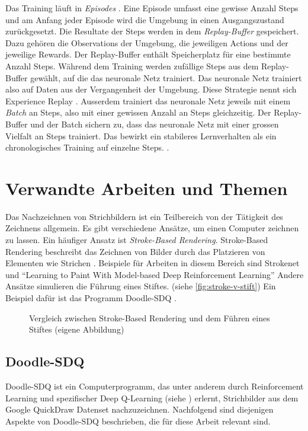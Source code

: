 Das Training läuft in \emph{Episodes} \cite[S. 14]{sutton_reinforcement_2014}.
Eine Episode umfasst eine gewisse Anzahl Steps und am Anfang jeder Episode wird
die Umgebung in einen Ausgangszustand zurückgesetzt. Die Resultate der Steps
werden in dem \emph{Replay-Buffer} gespeichert. Dazu gehören die Observations
der Umgebung, die jeweiligen Actions und der jeweilige Rewards. Der
Replay-Buffer enthält Speicherplatz für eine bestimmte Anzahl Steps. Während dem
Training werden zufällige Steps aus dem Replay-Buffer gewählt, auf die das
neuronale Netz trainiert. Das neuronale Netz trainiert also auf Daten aus der
Vergangenheit der Umgebung. Diese Strategie nennt sich Experience Replay
\cite[S. 5]{mnih_playing_2013}. Ausserdem trainiert das neuronale Netz jeweils
mit einem \emph{Batch} an Steps, also mit einer gewissen Anzahl an Steps
gleichzeitig. Der Replay-Buffer und der Batch sichern zu, dass das neuronale
Netz mit einer grossen Vielfalt an Steps trainiert. Das bewirkt ein stabileres
Lernverhalten als ein chronologisches Training auf einzelne Steps.
\cite{phd_how_2021}.
 
 
\section{Verwandte Arbeiten und Themen}\label{chap:t_ver} Das Nachzeichnen von
Strichbildern ist ein Teilbereich von der Tätigkeit des Zeichnens allgemein. Es
gibt verschiedene Ansätze, um einen Computer zeichnen zu lassen. Ein häufiger
Ansatz ist \emph{Stroke-Based Rendering}. Stroke-Based Rendering beschreibt das
Zeichnen von Bilder durch das Platzieren von Elementen wie Strichen
\cite{aaron_hertzmann_stroke-based_2002}. Beispiele für Arbeiten in diesem Bereich sind
Strokenet \cite{zheng_strokenet_2018} und ``Learning to Paint With Model-based
Deep Reinforcement Learning'' \cite{huang_learning_2019} Andere Ansätze
simulieren die Führung eines Stiftes. (siehe \autoref{fig:stroke-v-stift}) Ein
Beispiel dafür ist das Programm Doodle-SDQ \cite{zhou_learning_2018}.
 
\begin{figure}[!ht]
   \centering
   \caption{Vergleich zwischen Stroke-Based Rendering und dem Führen eines Stiftes (eigene Abbildung)}\label{fig:stroke-v-stift}
\end{figure}
 
\subsection{Doodle-SDQ}\label{sub:t_ver_dood} Doodle-SDQ ist ein
Computerprogramm, das unter anderem durch Reinforcement Learning und
spezifischer Deep Q-Learning (siehe ) erlernt,
Strichbilder aus dem Google QuickDraw Datenset \cite{noauthor_quick_2022}
nachzuzeichnen. Nachfolgend sind diejenigen Aspekte von Doodle-SDQ beschrieben,
die für diese Arbeit relevant sind.
 
